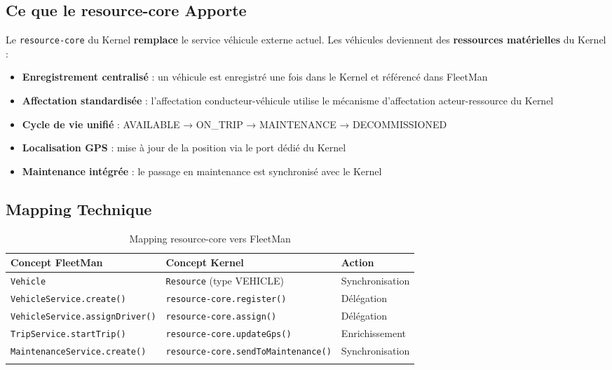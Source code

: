 \documentclass[12pt,a4paper]{report}
\begin{document}
\subsection{Ce que le resource-core Apporte}

Le \texttt{resource-core} du Kernel \textbf{remplace} le service véhicule externe actuel. Les véhicules deviennent des \textbf{ressources matérielles} du Kernel :

\begin{itemize}[leftmargin=2cm]
  \item \textbf{Enregistrement centralisé} : un véhicule est enregistré une fois dans le Kernel et référencé dans FleetMan
  \item \textbf{Affectation standardisée} : l'affectation conducteur-véhicule utilise le mécanisme d'affectation acteur-ressource du Kernel
  \item \textbf{Cycle de vie unifié} : AVAILABLE → ON\_TRIP → MAINTENANCE → DECOMMISSIONED
  \item \textbf{Localisation GPS} : mise à jour de la position via le port dédié du Kernel
  \item \textbf{Maintenance intégrée} : le passage en maintenance est synchronisé avec le Kernel
\end{itemize}

\subsection{Mapping Technique}

\begin{longtable}{p{5cm}p{5cm}p{3cm}}
\toprule
\textbf{Concept FleetMan} & \textbf{Concept Kernel} & \textbf{Action} \\
\midrule
\endhead
\texttt{Vehicle} & \texttt{Resource} (type VEHICLE) & Synchronisation \\
\texttt{VehicleService.create()} & \texttt{resource-core.register()} & Délégation \\
\texttt{VehicleService.assignDriver()} & \texttt{resource-core.assign()} & Délégation \\
\texttt{TripService.startTrip()} & \texttt{resource-core.updateGps()} & Enrichissement \\
\texttt{MaintenanceService.create()} & \texttt{resource-core.sendToMaintenance()} & Synchronisation \\
\bottomrule
\caption{Mapping resource-core vers FleetMan}
\end{longtable}
\end{document}
